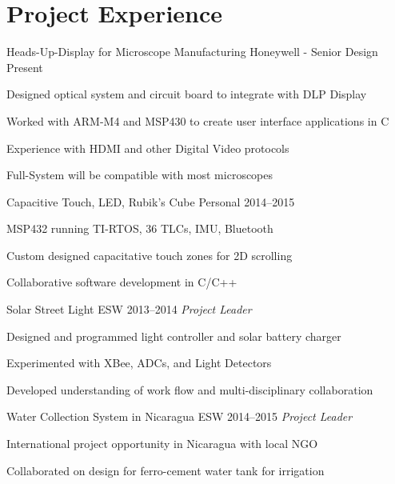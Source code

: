 \documentclass[]{friggeri-cv} %
\begin{document}
\section{\sc Project Experience}
\begin{entrylist}
\entryFourItem
{Heads-Up-Display for Microscope Manufacturing}
{Honeywell - Senior Design}
{Present}
{\begin{itemizenosep}
	\item Designed optical system and circuit board to integrate with DLP Display
	\item Worked with ARM-M4 and MSP430 to create user interface applications in C
	\item Experience with HDMI and other Digital Video protocols
	\item Full-System will be compatible with most microscopes
\end{itemizenosep}}
\entryFourItem
{Capacitive Touch, LED, Rubik's Cube}
{Personal}
{2014--2015}
{\begin{itemizenosep}
	\item MSP432 running TI-RTOS, 36 TLCs, IMU, Bluetooth
	\item Custom designed capacitative touch zones for 2D scrolling
	\item Collaborative software development in C/C++ 
\end{itemizenosep}}
\entry
{Solar Street Light}
{ESW}
{2013--2014}
{\emph{Project Leader}}
{\begin{itemizenosep}
	\item Designed and programmed light controller and solar battery charger
	\item Experimented with XBee, ADCs, and Light Detectors
	\item Developed understanding of work flow and multi-disciplinary collaboration
\end{itemizenosep}}
\entry
{Water Collection System in Nicaragua}
{ESW}
{2014--2015}
{\emph{Project Leader}}
{\begin{itemizenosep}
	\item International project opportunity in Nicaragua with local NGO
	\item Collaborated on design for ferro-cement water tank for irrigation

\end{itemizenosep}}
\end{entrylist}
\end{document}

